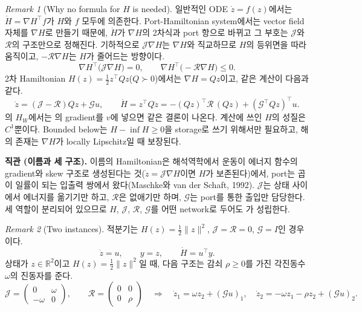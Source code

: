 \documentclass[11pt]{article}\usepackage[margin=1in]{geometry}\usepackage{amsmath,amssymb,amsthm,mathtools}\usepackage{graphicx}\graphicspath{{figures/}{../figures/}{figs/}{./}}\usepackage{enumitem}\usepackage{hyperref}\usepackage{cleveref}\usepackage{tikz}\usetikzlibrary{arrows.meta,positioning,calc,shapes.geometric}\usepackage{float}\usepackage{rotating}\usepackage[most]{tcolorbox}\usepackage{kotex}\usepackage{booktabs}\emergencystretch=1.6em\tolerance=2000 \crefname{assumption}{Assumption}{Assumptions}\Crefname{assumption}{Assumption}{Assumptions}\crefname{definition}{Definition}{Definitions}\Crefname{definition}{Definition}{Definitions}\crefname{proposition}{Proposition}{Propositions}\Crefname{proposition}{Proposition}{Propositions}\crefname{fact}{Fact}{Facts}\Crefname{fact}{Fact}{Facts} \newtheorem{assumption}{Assumption}\newtheorem{definition}{Definition}\newtheorem{lemma}{Lemma}\newtheorem{proposition}{Proposition}\newtheorem{theorem}{Theorem}\newtheorem{corollary}{Corollary}\newtheorem{fact}{Fact}\theoremstyle{remark}\newtheorem{remark}{Remark} \newcommand{\R}{\mathbb{R}}\newcommand{\xb}{\bar x}\newcommand{\Ab}{\bar A}\newcommand{\By}{\bar B_y}\newcommand{\U}{\mathcal U}\newcommand{\Z}{\mathcal Z}
\begin{document}
\begin{remark}[Why no formula for $H$ is needed]
\label{rem:noformula}
일반적인 ODE $\dot z=f(z)$에서는 $\dot H=\nabla H^\top f$가 $H$와 $f$ 모두에 의존한다. Port-Hamiltonian system에서는 vector field 자체를 $\nabla H$로 만들기 때문에, $\dot H$가 $\nabla H$의 2차식과 port 항으로 바뀌고 그 부호는 $\mathcal J$와 $\mathcal R$의 구조만으로 정해진다. 기하적으로 $\mathcal J\nabla H$는 $\nabla H$와 직교하므로 $H$의 등위면을 따라 움직이고, $-\mathcal R\nabla H$는 $H$가 줄어드는 방향이다.
\[
\nabla H^\top\big(\mathcal J\nabla H\big)=0,\qquad \nabla H^\top\big(-\mathcal R\nabla H\big)\le0 .
\]
2차 Hamiltonian $H(z)=\tfrac12z^\top Qz$($Q\succ0$)에서는 $\nabla H=Qz$이고, 같은 계산이 다음과 같다.
\[
\dot z=(\mathcal J-\mathcal R)Qz+\mathcal Gu,\qquad \dot H=z^\top Q\dot z=-(Qz)^\top\mathcal R\,(Qz)+(\mathcal G^\top Qz)^\top u .
\]
의 $H_W$에서는 의 gradient를 $v$에 넣으면 같은 결론이 나온다. 계산에 쓰인 $H$의 성질은 $C^1$뿐이다. Bounded below는 $H-\inf H\ge0$을 storage로 쓰기 위해서만 필요하고, 해의 존재는 $\nabla H$가 locally Lipschitz일 때 보장된다.
\end{remark}

\textbf{직관 (이름과 세 구조).} 이름의 Hamiltonian은 해석역학에서 운동이 에너지 함수의 gradient와 skew 구조로 생성된다는 것($\dot z=\mathcal J\nabla H$이면 $H$가 보존된다)에서, port는 곱이 일률이 되는 입출력 쌍에서 왔다(Maschke와 van der Schaft, 1992). $\mathcal J$는 상태 사이에서 에너지를 옮기기만 하고, $\mathcal R$은 없애기만 하며, $\mathcal G$는 port를 통한 출입만 담당한다. 세 역할이 분리되어 있으므로 $H$, $\mathcal J$, $\mathcal R$, $\mathcal G$를 어떤 network로 두어도 가 성립한다.

\begin{remark}[Two instances]
\label{rem:phex}
적분기는 $H(z)=\tfrac12\|z\|^2$, $\mathcal J=\mathcal R=0$, $\mathcal G=I$인 경우이다.
\[
\dot z=u,\qquad y=z,\qquad \dot H=u^\top y .
\]
상태가 $z\in\R^2$이고 $H(z)=\tfrac12\|z\|^2$일 때, 다음 구조는 감쇠 $\rho\ge0$를 가진 각진동수 $\omega$의 진동자를 준다.
\[
\mathcal J=\begin{pmatrix}0&\omega\\-\omega&0\end{pmatrix},\qquad \mathcal R=\begin{pmatrix}0&0\\0&\rho\end{pmatrix}\quad\Longrightarrow\quad \dot z_1=\omega z_2+(\mathcal Gu)_1,\quad \dot z_2=-\omega z_1-\rho z_2+(\mathcal Gu)_2 .
\]
\end{remark}
\end{document}

